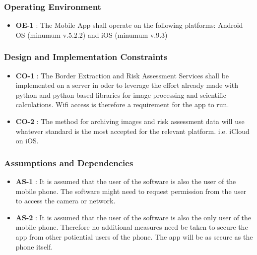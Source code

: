         \subsubsection{Operating Environment}

                    \noindent
                    \begin{itemize}[leftmargin=*]
                        \item[]  \textbf{OE-1} : The Mobile App shall operate on the following platforms: Android OS (minumum v.5.2.2) and iOS (minumum v.9.3)

                    \end{itemize}


        \subsubsection{Design and Implementation Constraints}

                    \noindent
                    \begin{itemize}[leftmargin=*]
                        \item[]  \textbf{CO-1} : The Border Extraction and Risk Assessment Services shall be implemented on a server in oder to leverage the effort already made with python and python based libraries for image processing and scientific calculations. Wifi access is therefore a requirement for the app to run.
                        \item[]  \textbf{CO-2} : The method for archiving images and risk assessment data will use whatever standard is the most accepted for the relevant platform. i.e. iCloud on iOS.


                    \end{itemize}

        \subsubsection{Assumptions and Dependencies}

                    \noindent
                    \begin{itemize}[leftmargin=*]
                        \item[]  \textbf{AS-1} : It is assumed that the user of the software is also the user of the mobile phone. The software might need to request permission from the user to access the camera or network.

                    \end{itemize}

                    \noindent
                    \begin{itemize}[leftmargin=*]
                        \item[]  \textbf{AS-2} : It is assumed that the user of the software is also the only user of the mobile phone. Therefore no additional measures need be taken to secure the app from other potiential users of the phone. The app will be as secure as the phone itself.

                    \end{itemize}